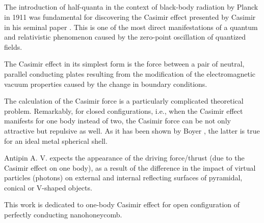 \documentclass[twoside, 10pt]{article}
\def\myvspacebeforesubsection{-2.0mm}
\def\myvspaceaftersubsection{-2.5mm}
\begin{document}
\begin{multicols}{2}

\vspace{\myvspacebeforesubsection}
    \subsection*{}\label{introduction}
\vspace{\myvspaceaftersubsection}

The introduction of half-quanta in the context of
black-body radiation by Planck in 1911 was fundamental for discovering the Casimir effect
presented by Casimir in his seminal paper \cite{Casimir1948}.
This is one of the most direct
manifestations of a quantum and relativistic phenomenon caused by the
zero-point oscillation of quantized fields.

The Casimir effect in its simplest form is the force between a pair of
neutral, parallel conducting plates resulting from the modification of
the electromagnetic vacuum properties caused by the change in boundary conditions.

The calculation of the Casimir force is a particularly complicated
theoretical problem. Remarkably, for closed configurations, i.e., when the
Casimir effect manifests for one body instead of two, the Casimir force can be not
only attractive but repulsive as well. As it has been shown by Boyer
\cite{Boyer1968}, the latter is true for an ideal metal spherical shell.

Antipin A. V. \cite{Antipin2012} expects the appearance of the driving force/thrust (due to the Casimir
effect on one body), as a result of the difference in the impact of virtual particles (photons) on
external and internal reflecting surfaces of pyramidal, conical or \mbox{V-shaped} objects.

This work is dedicated to one-body Casimir effect for open
configuration of perfectly conducting nanohoneycomb.




\end{multicols}
\end{document}
